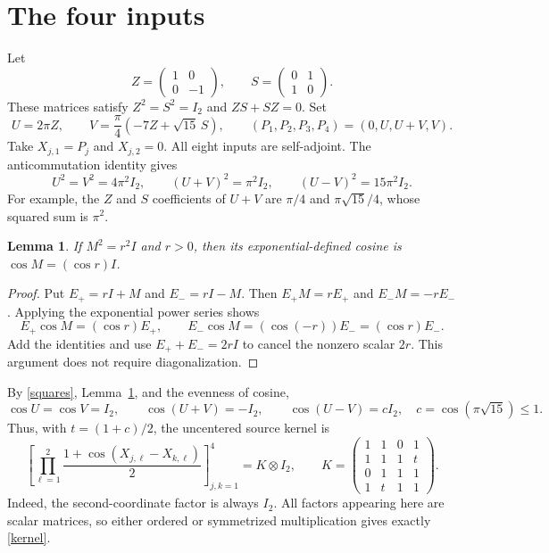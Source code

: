 \documentclass[11pt]{article}
\newtheorem{lemma}[theorem]{Lemma}
\newcommand{\I}{I_2}
\begin{document}
\section{The four inputs}
Let
\[
 Z=\begin{pmatrix}1&0\\0&-1\end{pmatrix},\qquad
 S=\begin{pmatrix}0&1\\1&0\end{pmatrix}.
\]
These matrices satisfy $Z^2=S^2=\I$ and $ZS+SZ=0$. Set
\begin{equation}\label{uv}
 U=2\pi Z,\qquad V=\frac\pi4(-7Z+\sqrt{15}\,S),
 \qquad (P_1,P_2,P_3,P_4)=(0,U,U+V,V).
\end{equation}
Take $X_{j,1}=P_j$ and $X_{j,2}=0$. All eight inputs are self-adjoint.
The anticommutation identity gives
\begin{equation}\label{squares}
 U^2=V^2=4\pi^2\I,\qquad
 (U+V)^2=\pi^2\I,\qquad
 (U-V)^2=15\pi^2\I.
\end{equation}
For example, the $Z$ and $S$ coefficients of $U+V$ are
$\pi/4$ and $\pi\sqrt{15}/4$, whose squared sum is $\pi^2$.

\begin{lemma}\label{cosine}
If $M^2=r^2I$ and $r>0$, then its exponential-defined cosine is
$\cos M=(\cos r)I$.
\end{lemma}
\begin{proof}
Put $E_+=rI+M$ and $E_-=rI-M$. Then
$E_+M=rE_+$ and $E_-M=-rE_-$. Applying the exponential power series
shows
\[
 E_+\cos M=(\cos r)E_+,\qquad
 E_-\cos M=(\cos(-r))E_-=(\cos r)E_-.
\]
Add the identities and use $E_++E_-=2rI$ to cancel the nonzero scalar
$2r$. This argument does not require diagonalization.
\end{proof}
By \eqref{squares}, Lemma~\ref{cosine}, and the evenness of cosine,
\[
 \cos U=\cos V=\I,\qquad
 \cos(U+V)=-\I,\qquad
 \cos(U-V)=c\I,\quad c=\cos(\pi\sqrt{15})\leq1.
\]
Thus, with $t=(1+c)/2$, the uncentered source kernel is
\begin{equation}\label{kernel}
 \left[\prod_{\ell=1}^{2}
 \frac{1+\cos(X_{j,\ell}-X_{k,\ell})}{2}\right]_{j,k=1}^4
 =K\otimes\I,\qquad
 K=\begin{pmatrix}
 1&1&0&1\\1&1&1&t\\0&1&1&1\\1&t&1&1
 \end{pmatrix}.
\end{equation}
Indeed, the second-coordinate factor is always $\I$.
All factors appearing here are scalar matrices, so either ordered or
symmetrized multiplication gives exactly \eqref{kernel}.
\end{document}
